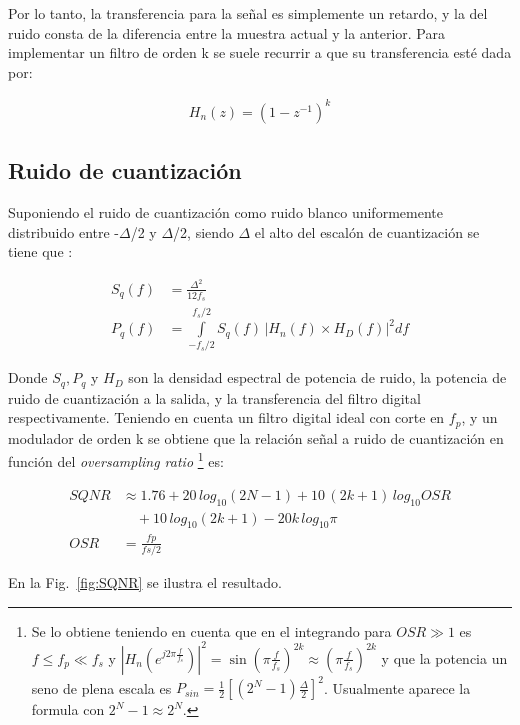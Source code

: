 \documentclass[a4paper,conference]{IEEEtran}
\begin{document}
Por lo tanto, la transferencia para la señal es simplemente un retardo, y la del ruido consta de la diferencia entre la muestra actual y la anterior.
Para implementar un filtro de orden k se suele recurrir a que su transferencia esté dada por:

\begin{align}
H_n(z)=\left( 1-z^{-1}\right)^{k}
\end{align}

\subsection{Ruido de cuantizaci\'on}
Suponiendo el ruido de cuantización como ruido blanco uniformemente distribuido entre -$\Delta$/2 y $\Delta$/2, siendo $\Delta$ el alto del escal\'on de cuantización se tiene que \cite{Tesis:Hellman}:

\begin{align}
S_q(f) &= \frac{\Delta^{2}}{12f_s}\\
P_{q}(f) &=\int\limits_{-f_s/2}^{f_s/2}S_q(f) \, |H_n(f) \times H_D(f)|^{2} df
\end{align}

Donde $S_q,P_q$ y $H_D$ son la densidad espectral de potencia de ruido, la potencia de ruido de cuantizaci\'on a la salida, y la transferencia del filtro digital respectivamente.
Teniendo en cuenta un filtro digital ideal con corte en $f_p$, y un modulador de orden k se obtiene que la relaci\'on se\~nal a ruido de cuantizaci\'on en funci\'on del \textit{oversampling ratio}
\footnote[1]
{
Se lo obtiene teniendo en cuenta que en el integrando para $OSR\gg 1$ es $f\leq f_p\ll f_s$ y $|H_n(e^{j2 \pi \frac{f}{f_s}})|^{2}= \sin(\pi \frac{f}{f_s})^{2k} \approx (\pi\frac{f}{f_s})^{2k}$ y que la potencia un seno de plena escala es $P_{sin}=\frac{1}{2} [(2^N-1)\frac{\Delta}{2}]^{2}$.
Usualmente aparece la formula con $2^{N}-1\approx2^N$.
} es:

\begin{align}
SQNR &\approx 1.76+20\,log_{10}(2N-1)+10\,(2k+1)\,log_{10}OSR\nonumber\\
&\quad
+10\,log_{10}(2k+1)-20k\,log_{10}\pi \\
OSR&=\frac{fp}{fs/2}
\end{align}

En la Fig.~\ref{fig:SQNR} se ilustra el resultado.
\end{document}
